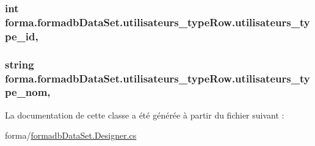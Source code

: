 \subsubsection[{\texorpdfstring{utilisateurs\+\_\+type\+\_\+id}{utilisateurs_type_id}}]{\setlength{\rightskip}{0pt plus 5cm}int forma.\+formadb\+Data\+Set.\+utilisateurs\+\_\+type\+Row.\+utilisateurs\+\_\+type\+\_\+id\hspace{0.3cm}{\ttfamily [get]}, {\ttfamily [set]}}\hypertarget{classforma_1_1formadb_data_set_1_1utilisateurs__type_row_a46cdf2406a5d6b0230d1fdc17cd940a4}{}\label{classforma_1_1formadb_data_set_1_1utilisateurs__type_row_a46cdf2406a5d6b0230d1fdc17cd940a4}
\subsubsection[{\texorpdfstring{utilisateurs\+\_\+type\+\_\+nom}{utilisateurs_type_nom}}]{\setlength{\rightskip}{0pt plus 5cm}string forma.\+formadb\+Data\+Set.\+utilisateurs\+\_\+type\+Row.\+utilisateurs\+\_\+type\+\_\+nom\hspace{0.3cm}{\ttfamily [get]}, {\ttfamily [set]}}\hypertarget{classforma_1_1formadb_data_set_1_1utilisateurs__type_row_ad4c3b42c3f5b7f0fa98f771551eb8d48}{}\label{classforma_1_1formadb_data_set_1_1utilisateurs__type_row_ad4c3b42c3f5b7f0fa98f771551eb8d48}


La documentation de cette classe a été générée à partir du fichier suivant \+:\begin{DoxyCompactItemize}
\item 
forma/\hyperlink{formadb_data_set_8_designer_8cs}{formadb\+Data\+Set.\+Designer.\+cs}\end{DoxyCompactItemize}
